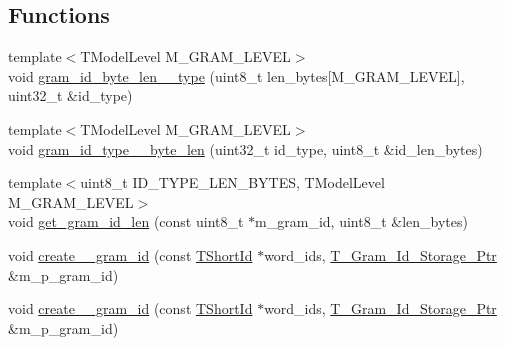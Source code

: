 \subsection*{Functions}
\begin{DoxyCompactItemize}
\item 
{\footnotesize template$<$T\+Model\+Level M\+\_\+\+G\+R\+A\+M\+\_\+\+L\+E\+V\+E\+L$>$ }\\void \hyperlink{namespaceuva_1_1smt_1_1tries_1_1mgrams_1_1_____byte___m___gram___id_acbec0de892800bb9062a6996a2e9b33d}{gram\+\_\+id\+\_\+byte\+\_\+len\+\_\+\_\+type} (uint8\+\_\+t len\+\_\+bytes\mbox{[}M\+\_\+\+G\+R\+A\+M\+\_\+\+L\+E\+V\+E\+L\mbox{]}, uint32\+\_\+t \&id\+\_\+type)
\item 
{\footnotesize template$<$T\+Model\+Level M\+\_\+\+G\+R\+A\+M\+\_\+\+L\+E\+V\+E\+L$>$ }\\void \hyperlink{namespaceuva_1_1smt_1_1tries_1_1mgrams_1_1_____byte___m___gram___id_a5817d3105a8f3aa35e1e9a5a9c100226}{gram\+\_\+id\+\_\+type\+\_\+\_\+byte\+\_\+len} (uint32\+\_\+t id\+\_\+type, uint8\+\_\+t \&id\+\_\+len\+\_\+bytes)
\item 
{\footnotesize template$<$uint8\+\_\+t I\+D\+\_\+\+T\+Y\+P\+E\+\_\+\+L\+E\+N\+\_\+\+B\+Y\+T\+E\+S, T\+Model\+Level M\+\_\+\+G\+R\+A\+M\+\_\+\+L\+E\+V\+E\+L$>$ }\\void \hyperlink{namespaceuva_1_1smt_1_1tries_1_1mgrams_1_1_____byte___m___gram___id_afe44767612a24237ac41826b1826f8e1}{get\+\_\+gram\+\_\+id\+\_\+len} (const uint8\+\_\+t $\ast$m\+\_\+gram\+\_\+id, uint8\+\_\+t \&len\+\_\+bytes)
\item 
void \hyperlink{namespaceuva_1_1smt_1_1tries_1_1mgrams_1_1_____byte___m___gram___id_aab50535b7592a07dd611a02246a12399}{create\+\_\+\_\+gram\+\_\+id} (const \hyperlink{namespaceuva_1_1smt_1_1hashing_adcf22e1982ad09d3a63494c006267469}{T\+Short\+Id} $\ast$word\+\_\+ids, \hyperlink{namespaceuva_1_1smt_1_1tries_1_1mgrams_1_1_m___gram___id_a478e6468dbd5dab37599c566d77c845c}{T\+\_\+\+Gram\+\_\+\+Id\+\_\+\+Storage\+\_\+\+Ptr} \&m\+\_\+p\+\_\+gram\+\_\+id)
\item 
void \hyperlink{namespaceuva_1_1smt_1_1tries_1_1mgrams_1_1_____byte___m___gram___id_a078f7f3e59f9fe3256278373e3635b56}{create\+\_\+\_\+gram\+\_\+id} (const \hyperlink{namespaceuva_1_1smt_1_1hashing_adcf22e1982ad09d3a63494c006267469}{T\+Short\+Id} $\ast$word\+\_\+ids, \hyperlink{namespaceuva_1_1smt_1_1tries_1_1mgrams_1_1_m___gram___id_a478e6468dbd5dab37599c566d77c845c}{T\+\_\+\+Gram\+\_\+\+Id\+\_\+\+Storage\+\_\+\+Ptr} \&m\+\_\+p\+\_\+gram\+\_\+id)

\end{DoxyCompactItemize}
